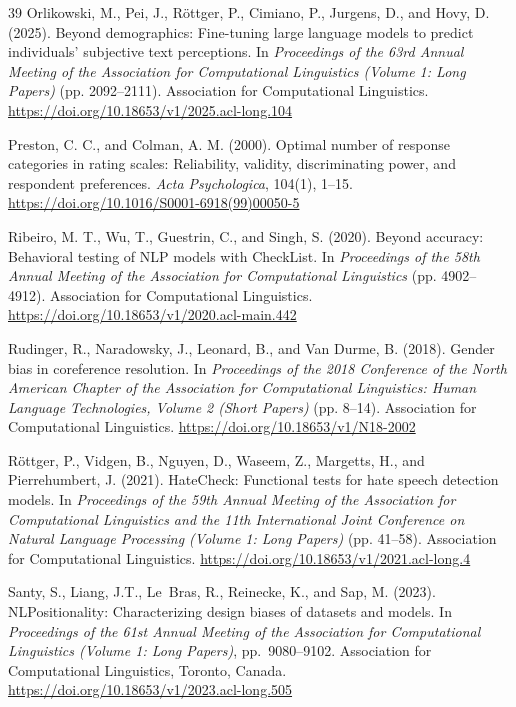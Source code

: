 \documentclass[a4paper,fleqn,review,longmktitle]{cas-sc}
\begin{document}
\begin{thebibliography}{39}
Orlikowski, M., Pei, J., R\"ottger, P., Cimiano, P., Jurgens, D., and Hovy, D. (2025).
Beyond demographics: Fine-tuning large language models to predict individuals' subjective text perceptions.
In \emph{Proceedings of the 63rd Annual Meeting of the Association for Computational Linguistics (Volume 1: Long Papers)} (pp. 2092--2111).
Association for Computational Linguistics.
\url{https://doi.org/10.18653/v1/2025.acl-long.104}

Preston, C. C., and Colman, A. M. (2000).
Optimal number of response categories in rating scales: Reliability, validity, discriminating power, and respondent preferences.
\emph{Acta Psychologica}, 104(1), 1--15.
\url{https://doi.org/10.1016/S0001-6918(99)00050-5}

Ribeiro, M. T., Wu, T., Guestrin, C., and Singh, S. (2020).
Beyond accuracy: Behavioral testing of NLP models with CheckList.
In \emph{Proceedings of the 58th Annual Meeting of the Association for Computational Linguistics} (pp. 4902--4912).
Association for Computational Linguistics.
\url{https://doi.org/10.18653/v1/2020.acl-main.442}

Rudinger, R., Naradowsky, J., Leonard, B., and Van Durme, B. (2018).
Gender bias in coreference resolution.
In \emph{Proceedings of the 2018 Conference of the North American Chapter of the Association for Computational Linguistics: Human Language Technologies, Volume 2 (Short Papers)} (pp. 8--14).
Association for Computational Linguistics.
\url{https://doi.org/10.18653/v1/N18-2002}

R\"ottger, P., Vidgen, B., Nguyen, D., Waseem, Z., Margetts, H., and Pierrehumbert, J. (2021).
HateCheck: Functional tests for hate speech detection models.
In \emph{Proceedings of the 59th Annual Meeting of the Association for Computational Linguistics and the 11th International Joint Conference on Natural Language Processing (Volume 1: Long Papers)} (pp. 41--58).
Association for Computational Linguistics.
\url{https://doi.org/10.18653/v1/2021.acl-long.4}

Santy, S., Liang, J.T., Le~Bras, R., Reinecke, K., and Sap, M. (2023).
NLPositionality: Characterizing design biases of datasets and models.
In \emph{Proceedings of the 61st Annual Meeting of the Association for Computational Linguistics (Volume 1: Long Papers)}, pp.~9080--9102. Association for Computational Linguistics, Toronto, Canada.
\url{https://doi.org/10.18653/v1/2023.acl-long.505}


\end{thebibliography}
\end{document}
